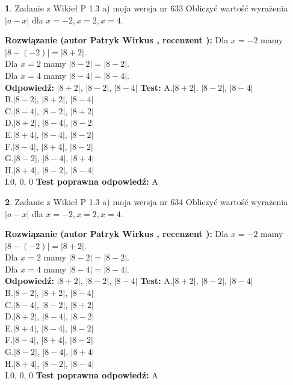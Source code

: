 \documentclass[12pt, a4paper]{article}
\theoremstyle{definition} %
\newtheorem{zad}{}
\newcommand{\zadStart}[1]{\begin{zad}#1\newline}
\newcommand{\zadStop}{\end{zad}}
\newcommand{\rozwStart}[2]{\noindent \textbf{Rozwiązanie (autor #1 , recenzent #2): }\newline}
\newcommand{\rozwStop}{\newline}
\newcommand{\odpStart}{\noindent \textbf{Odpowiedź:}\newline}
\newcommand{\odpStop}{\newline}
\newcommand{\testStart}{\noindent \textbf{Test:}\newline}
\newcommand{\testStop}{\newline}
\newcommand{\kluczStart}{\noindent \textbf{Test poprawna odpowiedź:}\newline}
\newcommand{\kluczStop}{\newline}
\begin{document}
\zadStart{Zadanie z Wikieł P 1.3 a) moja wersja nr 633}
Obliczyć wartość wyrażenia $|a - x|$ dla $x=-2,x=2,x=4$.
\zadStop
\rozwStart{Patryk Wirkus}{}
Dla $x = -2$ mamy $|8 - (-2)| = |8 + 2|$.\\
Dla $x = 2$ mamy $|8 - 2| = |8 - 2|$.\\
Dla $x = 4$ mamy $|8 - 4| = |8 - 4|$.\\
\rozwStop
\odpStart
$|8 + 2|$, $|8 - 2|$, $|8 - 4|$
\odpStop
\testStart
A.$|8 + 2|$, $|8 - 2|$, $|8 - 4|$\\
B.$|8 - 2|$, $|8 + 2|$, $|8 - 4|$\\
C.$|8 - 4|$, $|8 - 2|$, $|8 + 2|$\\
D.$|8 + 2|$, $|8 - 4|$, $|8 - 2|$\\
E.$|8 + 4|$, $|8 - 4|$, $|8 - 2|$\\
F.$|8 - 4|$, $|8 + 4|$, $|8 - 2|$\\
G.$|8 - 2|$, $|8 - 4|$, $|8 + 4|$\\
H.$|8 + 4|$, $|8 - 2|$, $|8 - 4|$\\
I.$0$, $0$, $0$
\testStop
\kluczStart
A
\kluczStop



\zadStart{Zadanie z Wikieł P 1.3 a) moja wersja nr 634}
Obliczyć wartość wyrażenia $|a - x|$ dla $x=-2,x=2,x=4$.
\zadStop
\rozwStart{Patryk Wirkus}{}
Dla $x = -2$ mamy $|8 - (-2)| = |8 + 2|$.\\
Dla $x = 2$ mamy $|8 - 2| = |8 - 2|$.\\
Dla $x = 4$ mamy $|8 - 4| = |8 - 4|$.\\
\rozwStop
\odpStart
$|8 + 2|$, $|8 - 2|$, $|8 - 4|$
\odpStop
\testStart
A.$|8 + 2|$, $|8 - 2|$, $|8 - 4|$\\
B.$|8 - 2|$, $|8 + 2|$, $|8 - 4|$\\
C.$|8 - 4|$, $|8 - 2|$, $|8 + 2|$\\
D.$|8 + 2|$, $|8 - 4|$, $|8 - 2|$\\
E.$|8 + 4|$, $|8 - 4|$, $|8 - 2|$\\
F.$|8 - 4|$, $|8 + 4|$, $|8 - 2|$\\
G.$|8 - 2|$, $|8 - 4|$, $|8 + 4|$\\
H.$|8 + 4|$, $|8 - 2|$, $|8 - 4|$\\
I.$0$, $0$, $0$
\testStop
\kluczStart
A
\kluczStop
\end{document}
